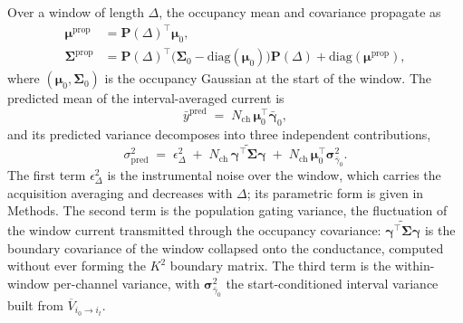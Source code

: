 Over a window of length $\Delta$, the occupancy mean and covariance propagate as
\begin{align}
  \bm{\mu}^{\mathrm{prop}} &= \mathbf{P}(\Delta)^\top \bm{\mu}_0, \label{eq:mu-prop}\\
  \bm{\Sigma}^{\mathrm{prop}} &= \mathbf{P}(\Delta)^\top\bigl(\bm{\Sigma}_0-\mathrm{diag}(\bm{\mu}_0)\bigr)\mathbf{P}(\Delta) + \mathrm{diag}(\bm{\mu}^{\mathrm{prop}}), \label{eq:sig-prop}
\end{align}
where $(\bm{\mu}_0, \bm{\Sigma}_0)$ is the occupancy Gaussian at the start of the window.
The predicted mean of the interval-averaged current is
\begin{equation}
  \bar{y}^{\mathrm{pred}} \;=\; N_{\mathrm{ch}}\,\bm{\mu}_0^\top \bar{\bm{\gamma}}_0,
  \label{eq:ypred}
\end{equation}
and its predicted variance decomposes into three independent contributions,
\begin{equation}
  \sigma^2_{\mathrm{pred}} \;=\; \epsilon^2_{\Delta}
  \;+\; N_{\mathrm{ch}}\,\widetilde{\bm{\gamma}^\top\bm{\Sigma}\bm{\gamma}}
  \;+\; N_{\mathrm{ch}}\,\bm{\mu}_0^\top\bm{\sigma}^2_{\bar{\gamma}_0}.
  \label{eq:pred-var}
\end{equation}
The first term $\epsilon^2_{\Delta}$ is the instrumental noise over the window, which
carries the acquisition averaging and decreases with $\Delta$; its parametric form is given
in Methods. The second term is the population gating variance, the fluctuation of the window
current transmitted through the occupancy covariance: $\widetilde{\bm{\gamma}^\top\bm{\Sigma}\bm{\gamma}}$
is the boundary covariance of the window collapsed onto the conductance, computed without
ever forming the $K^2$ boundary matrix. The third term is the within-window per-channel
variance, with $\bm{\sigma}^2_{\bar{\gamma}_0}$ the start-conditioned interval variance
built from $\overline{V}_{i_0\to i_t}$.

